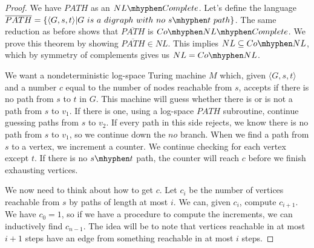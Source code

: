 \begin{proof}
	
	We have $PATH$ as an $NL\mhyphen Complete$.  Let's define the language $\overline{PATH} = \{ \langle G,s,t\rangle | G \ is \ a \ digraph \ with \ no \ s\mhyphen t \ path    \}$.  The same reduction as before shows that $\overline{PATH}$ is $Co\mhyphen NL\mhyphen Complete$.  We prove this theorem by showing $\overline{PATH}\in NL$.  This implies $NL\subseteq Co\mhyphen NL$, which by symmetry of complements gives us $NL = Co\mhyphen NL$.
	
	We want a nondeterministic log-space Turing machine $M$ which, given $\langle G,s,t \rangle$ and a number $c$ equal to the number of nodes reachable from $s$, accepts if there is no path from $s$ to $t$ in $G$.  This machine will guess whether there is or is not a path from $s$ to $v_1$.  If there is one, using a log-space $PATH$ subroutine, continue guessing paths from $s$ to $v_2$.  If every path in this side rejects, we know there is no path from $s$ to $v_1$, so we continue down the $no$ branch.  When we find a path from $s$ to a vertex, we increment a counter.  We continue checking for each vertex except $t$. If there is no $s\mhyphen t$ path, the counter will reach $c$ before we finish exhausting vertices.
	
	We now need to think about how to get $c$.  Let $c_i$ be the number of vertices reachable from $s$ by paths of length at most $i$.  We can, given $c_i$, compute $c_{i+1}$.  We have $c_0=1$, so if we have a procedure to compute the increments, we can inductively find $c_{n-1}$.  The idea will be to note that vertices reachable in at most $i+1$ steps have an edge from something reachable in at most $i$ steps.  
	
	
	
\end{proof}



